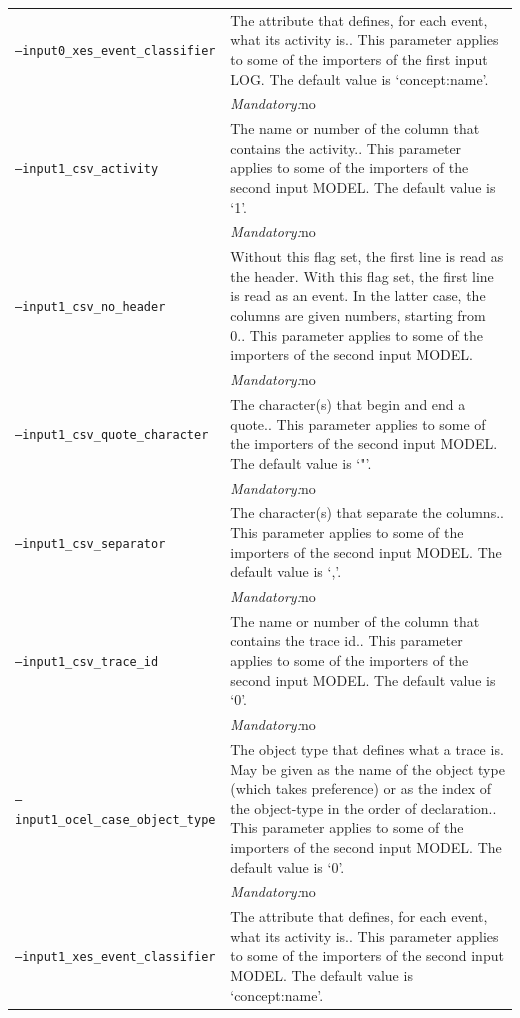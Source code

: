 {\begin{tabularx}{\linewidth}{lX}
\texttt{--input0\_xes\_event\_classifier} & The attribute that defines, for each event, what its activity is.. This parameter applies to some of the importers of the first input LOG. The default value is `concept:name'.\\
&\textit{Mandatory:}\quad no\\
\texttt{--input1\_csv\_activity} & The name or number of the column that contains the activity.. This parameter applies to some of the importers of the second input MODEL. The default value is `1'.\\
&\textit{Mandatory:}\quad no\\
\texttt{--input1\_csv\_no\_header} & Without this flag set, the first line is read as the header. 
    With this flag set, the first line is read as an event. In the latter case, the columns are given numbers, starting from 0.. This parameter applies to some of the importers of the second input MODEL. \\
&\textit{Mandatory:}\quad no\\
\texttt{--input1\_csv\_quote\_character} & The character(s) that begin and end a quote.. This parameter applies to some of the importers of the second input MODEL. The default value is `"'.\\
&\textit{Mandatory:}\quad no\\
\texttt{--input1\_csv\_separator} & The character(s) that separate the columns.. This parameter applies to some of the importers of the second input MODEL. The default value is `,'.\\
&\textit{Mandatory:}\quad no\\
\texttt{--input1\_csv\_trace\_id} & The name or number of the column that contains the trace id.. This parameter applies to some of the importers of the second input MODEL. The default value is `0'.\\
&\textit{Mandatory:}\quad no\\
\texttt{--input1\_ocel\_case\_object\_type} & The object type that defines what a trace is. May be given as the name of the object type (which takes preference) or as the index of the object-type in the order of declaration.. This parameter applies to some of the importers of the second input MODEL. The default value is `0'.\\
&\textit{Mandatory:}\quad no\\
\texttt{--input1\_xes\_event\_classifier} & The attribute that defines, for each event, what its activity is.. This parameter applies to some of the importers of the second input MODEL. The default value is `concept:name'.\\

\end{tabularx}}
